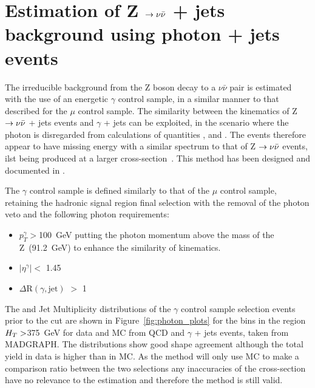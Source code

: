 \section{Estimation of Z  $\rightarrow \nu \bar{\nu}$ + jets background using photon + jets events}

The irreducible background from the Z boson decay to a $\nu \bar{\nu}$ pair is estimated with the use of an energetic $\gamma$ control sample, in a similar manner to that described for the $\mu$ control sample. The similarity between the kinematics of Z$ \rightarrow \nu \bar{\nu}$ + jets events and $\gamma$ + jets can be exploited, in the scenario where the photon is disregarded from calculations of quantities \HT, \MHT and \alt. The events therefore appear to have missing energy with a similar spectrum to that of Z $\rightarrow \nu \bar{\nu}$ events, ilst being produced at a larger cross-section~\cite{gamjetNLO}. This method has been designed and documented in \cite{SUS-10-001}.

The $\gamma$ control sample is defined similarly to that of the $\mu$ control sample, retaining the hadronic signal region final selection with the removal of the photon veto and the following photon requirements:

\begin{itemize}
\item $p^{\gamma}_{T} > $100~GeV putting the photon momentum above the mass of the Z~(91.2~GeV) to enhance the similarity of kinematics.
\item $| \eta^{\gamma}| <$ 1.45
\item $\Delta \textrm{R}(\gamma, \textrm{jet})$ $>$ 1
\end{itemize}

The \alt and Jet Multiplicity distributions of the $\gamma$ control sample selection events prior to the \alt cut are shown in Figure~\ref{fig:photon_plots} for the bins in the region $H_{T}  > $375~GeV for data and MC from QCD and $\gamma$ + jets events, taken from MADGRAPH. The distributions show good shape agreement although the total yield in data is higher than in MC. As the method will only use MC to make a comparison ratio between the two selections any inaccuracies of the cross-section have no relevance to the estimation and therefore the method is still valid. 


